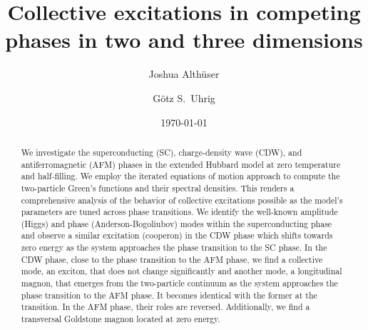 \documentclass[
    reprint, 
    aps,
    preprintnumbers,
    twocolumn,
    prb,
    superscriptaddress
]{revtex4-2}
\begin{document}
 

\title{Collective excitations in competing phases in two and three dimensions}


\author{Joshua Alth\"user}

\author{G\"otz S.~Uhrig}

\date{\today}

\begin{abstract}
    We investigate the superconducting (SC), charge-density wave (CDW), and antiferromagnetic (AFM) phases in the 
		extended Hubbard model at zero temperature and half-filling. 
    We employ the iterated equations of motion approach to compute the two-particle Green's functions and their
		spectral densities. 
    This renders a comprehensive analysis of the behavior of collective excitations possible as the 
		model's parameters are tuned across phase transitions. 
    We identify the well-known amplitude (Higgs) and phase (Anderson-Bogoliubov) modes within the 
		superconducting phase and observe a similar excitation (cooperon) in the CDW phase which shifts towards 
		zero energy as the system approaches the phase transition to the SC phase. 
    In the CDW phase, close to the phase transition to the AFM phase, 
    we find a collective mode, an exciton, that does not change significantly 
    and another mode, a longitudinal magnon, 
    that emerges from the two-particle continuum as the system approaches the phase transition to the AFM phase. 
    It becomes identical with the former at the transition.
		In the AFM phase, their roles are reversed.
    Additionally, we find a transversal Goldstone magnon located at zero energy.
\end{abstract}
\end{document}
